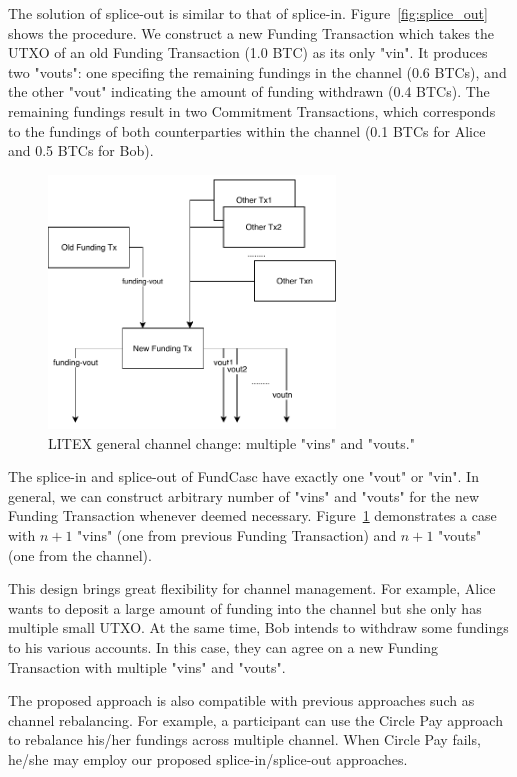 The solution of splice-out is similar to that of splice-in. Figure~\ref{fig:splice_out} shows the procedure. We construct a new Funding Transaction which takes the UTXO of an old Funding Transaction (1.0 BTC) as its only "vin". It produces two "vouts": one specifing the remaining fundings in the channel (0.6 BTCs), and the
other "vout" indicating the amount of funding withdrawn (0.4 BTCs). The remaining
fundings result in two Commitment Transactions, which corresponds to the fundings of both counterparties within the channel (0.1 BTCs for Alice and 0.5 BTCs for Bob).

\begin{figure}[t]
\centering
\includegraphics[width=3in]{figs/channel_change.pdf}
\vspace{-6pt}
\caption{LITEX general channel change: multiple "vins" and "vouts."}
\label{fig:change}
\end{figure}

The splice-in and splice-out of FundCasc have exactly one "vout" or "vin". In general, we can construct arbitrary number of "vins" and "vouts" for the new Funding Transaction whenever deemed necessary. Figure~\ref{fig:change} demonstrates a case with $n+1$ "vins" (one from previous Funding Transaction) and $n+1$ "vouts" (one from the channel).


This design brings great flexibility for channel management. For example,
Alice wants to deposit a large amount of funding into the channel but she only
has multiple small UTXO. At the same time, Bob intends to withdraw some fundings
to his various accounts. In this case, they can agree on a new Funding Transaction with multiple "vins" and "vouts".


The proposed approach is also compatible with previous approaches such as
channel rebalancing. For example, a participant can use the Circle Pay approach
to rebalance his/her fundings across multiple channel. When Circle Pay fails,
he/she may employ our proposed splice-in/splice-out approaches.
